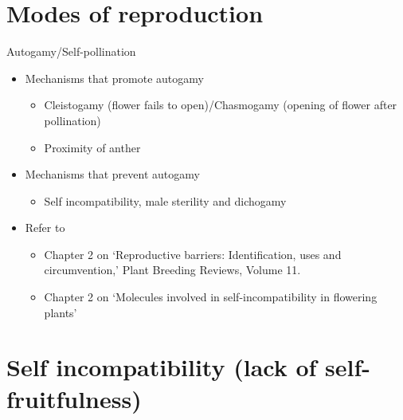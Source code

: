 \documentclass[11pt,ignorenonframetext,aspectratio=169]{beamer}
\providecommand{\tightlist}{%
  \setlength{\itemsep}{0pt}\setlength{\parskip}{0pt}}
\begin{document}
\hypertarget{modes-of-reproduction}{%
\section{Modes of reproduction}\label{modes-of-reproduction}}

\begin{frame}{Autogamy/Self-pollination}
\protect\hypertarget{autogamyself-pollination}{}
\begin{itemize}
\tightlist
\item
  Mechanisms that promote autogamy

  \begin{itemize}
  \tightlist
  \item
    Cleistogamy (flower fails to open)/Chasmogamy (opening of flower
    after pollination)
  \item
    Proximity of anther
  \end{itemize}
\item
  Mechanisms that prevent autogamy

  \begin{itemize}
  \tightlist
  \item
    Self incompatibility, male sterility and dichogamy
  \end{itemize}
\item
  Refer to

  \begin{itemize}
  \tightlist
  \item
    Chapter 2 on `Reproductive barriers: Identification, uses and
    circumvention,' Plant Breeding Reviews, Volume 11.
  \item
    Chapter 2 on `Molecules involved in self-incompatibility in
    flowering plants'
  \end{itemize}
\end{itemize}
\end{frame}

\hypertarget{self-incompatibility-lack-of-self-fruitfulness}{%
\section{Self incompatibility (lack of
self-fruitfulness)}\label{self-incompatibility-lack-of-self-fruitfulness}}
\end{document}

